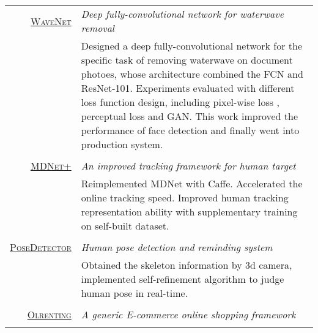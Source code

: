 \documentclass[a4paper,10pt]{article}
\begin{document}
\section{}
\begin{tabular}{r|p{12cm}}	
 \textsc{\href{}{WaveNet}} & \emph{Deep fully-convolutional network for waterwave removal}\\
& \footnotesize{Designed a deep fully-convolutional network for the specific task of removing 
waterwave on document photoes, whose architecture combined the FCN and 
ResNet-101. Experiments evaluated with different loss function design, including 
pixel-wise loss , perceptual loss and GAN. This work improved the performance
of face detection and finally went into production system.}\\\multicolumn{2}{c}{}
\\

 \textsc{\href{https://github.com/rao1219/MDNet}{MDNet+}} & \emph{An improved tracking framework for human target}\\
& \footnotesize{Reimplemented MDNet with Caffe. Accelerated the online tracking speed. Improved human tracking representation ability with supplementary training on
self-built dataset.}\\\multicolumn{2}{c}{} 
\\

 \textsc{\href{https://github.com/rao1219/intel_cup-3Dcamera}{PoseDetector}} & \emph{Human pose detection and reminding system}\\
&\footnotesize{Obtained the skeleton information by 3d camera, implemented self-refinement 
algorithm to judge human pose in real-time.}\\\multicolumn{2}{c}{}\\
\textsc{\href{https://github.com/rao1219/olhandicrafts}{Olrenting}} & \emph{A generic E-commerce online shopping framework}\\\multicolumn{2}{c}{} 

\end{tabular}






\end{document}
